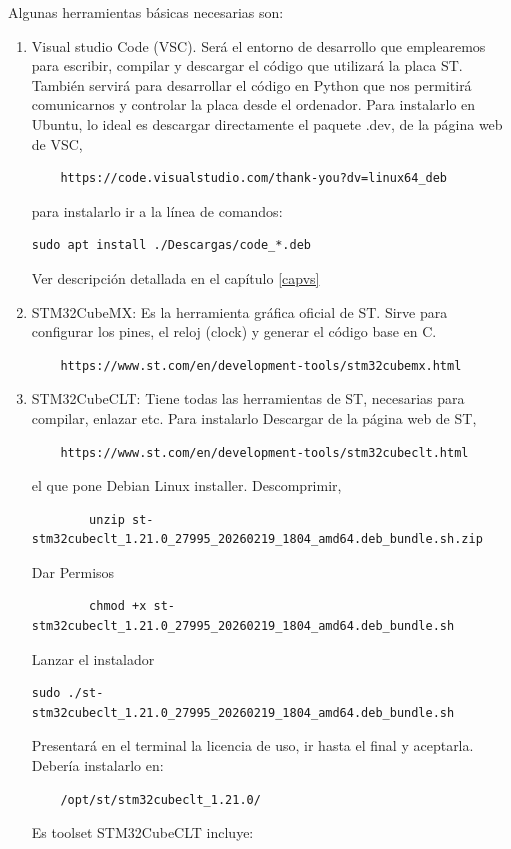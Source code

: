 Algunas herramientas básicas necesarias son:
\begin{enumerate}
	\item Visual studio Code (VSC).	
Será el entorno de desarrollo que emplearemos para escribir, compilar y descargar el código que utilizará la placa ST. También servirá para desarrollar el código en Python que nos permitirá comunicarnos y controlar la placa desde el ordenador. Para instalarlo en Ubuntu, lo ideal es descargar directamente el paquete .dev, de la página web de VSC,
\begin{verbatim}
	https://code.visualstudio.com/thank-you?dv=linux64_deb
\end{verbatim}
para instalarlo ir a la línea de comandos:
\begin{verbatim}
sudo apt install ./Descargas/code_*.deb	
\end{verbatim}

Ver descripción detallada en el capítulo \ref{capvs}
	
	\item STM32CubeMX: Es la herramienta gráfica oficial de ST. Sirve para 	configurar los pines, el reloj (clock) y generar el código base en C.
	\begin{verbatim}
	https://www.st.com/en/development-tools/stm32cubemx.html
	\end{verbatim}

	\item STM32CubeCLT:
	Tiene todas las herramientas de ST, necesarias para compilar, enlazar etc.
	Para instalarlo
	Descargar de la página web de ST,
	\begin{verbatim}
	https://www.st.com/en/development-tools/stm32cubeclt.html
	\end{verbatim}
	el que pone Debian Linux installer.
	Descomprimir,
	\begin{verbatim}
		unzip st-stm32cubeclt_1.21.0_27995_20260219_1804_amd64.deb_bundle.sh.zip
	\end{verbatim}
	Dar Permisos
	\begin{verbatim}
		chmod +x st-stm32cubeclt_1.21.0_27995_20260219_1804_amd64.deb_bundle.sh
	\end{verbatim}
Lanzar el instalador
\begin{verbatim}
sudo ./st-stm32cubeclt_1.21.0_27995_20260219_1804_amd64.deb_bundle.sh	
\end{verbatim}
Presentará en el terminal la licencia de uso, ir hasta el final y aceptarla.
Debería instalarlo en:
\begin{verbatim}
	/opt/st/stm32cubeclt_1.21.0/
\end{verbatim}
Es toolset STM32CubeCLT incluye:


\end{enumerate}
